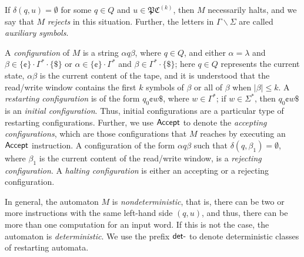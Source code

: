 If $\delta(q, u) = \emptyset$ for some $q \in Q$ and $u \in \mathfrak{PC}^{(k)}$, then $M$ necessarily halts, and we say that $M$ \emph{rejects} in this situation. Further, the letters in $\Gamma \backslash \Sigma$ are called \emph{auxiliary symbols}.

A \emph{configuration} of $M$ is a string $\alpha q \beta$, where $q \in Q$, and either $\alpha = \lambda$ and $\beta \in \{\cent\} \cdot \Gamma^* \cdot \{\$\}$ or $\alpha \in \{\cent\} \cdot \Gamma^*$ and $\beta \in \Gamma^* \cdot \{\$\}$; here $q \in Q$ represents the current state, $\alpha \beta$ is the current content of the tape, and it is understood that the read/write window contains the first $k$ symbols of $\beta$ or all of $\beta$ when $|\beta| \le k$. A \emph{restarting configuration} is of the form $q_0 \cent w \$$, where $w \in \Gamma^*$; if $w \in \Sigma^*$, then $q_0 \cent w \$$ is an \emph{initial configuration}. Thus, initial configurations are a particular type of restarting configurations. Further, we use \index{$\Accept$}$\Accept$ to denote the \emph{accepting configurations}, which are those configurations that $M$ reaches by executing an $\Accept$ instruction. A configuration of the form $\alpha q \beta$ such that $\delta(q, \beta_1) = \emptyset$, where $\beta_1$ is the current content of the read/write window, is a \emph{rejecting configuration}. A \emph{halting configuration} is either an accepting or a rejecting configuration.

In general, the automaton $M$ is \emph{nondeterministic}, that is, there can be two or more instructions with the same left-hand side $(q, u)$, and thus, there can be more than one computation for an input word. If this is not the case, the automaton is \emph{deterministic}. We use the prefix \index{$\detPrefix$}$\detPrefix$ to denote deterministic classes of restarting automata.

